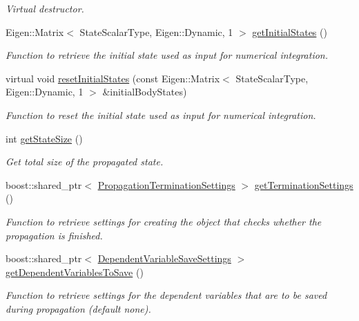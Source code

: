 \begin{DoxyCompactItemize}
\begin{DoxyCompactList}\small\item\em Virtual destructor. \end{DoxyCompactList}\item 
Eigen\+::\+Matrix$<$ State\+Scalar\+Type, Eigen\+::\+Dynamic, 1 $>$ \hyperlink{classtudat_1_1propagators_1_1PropagatorSettings_aabfec82eede276a2fd1151176e43d25d}{get\+Initial\+States} ()
\begin{DoxyCompactList}\small\item\em Function to retrieve the initial state used as input for numerical integration. \end{DoxyCompactList}\item 
virtual void \hyperlink{classtudat_1_1propagators_1_1PropagatorSettings_a372bd085a2032236531536f5d8c46fb3}{reset\+Initial\+States} (const Eigen\+::\+Matrix$<$ State\+Scalar\+Type, Eigen\+::\+Dynamic, 1 $>$ \&initial\+Body\+States)
\begin{DoxyCompactList}\small\item\em Function to reset the initial state used as input for numerical integration. \end{DoxyCompactList}\item 
int \hyperlink{classtudat_1_1propagators_1_1PropagatorSettings_a8d46d660668cc4c6401966f5089d3550}{get\+State\+Size} ()
\begin{DoxyCompactList}\small\item\em Get total size of the propagated state. \end{DoxyCompactList}\item 
boost\+::shared\+\_\+ptr$<$ \hyperlink{classtudat_1_1propagators_1_1PropagationTerminationSettings}{Propagation\+Termination\+Settings} $>$ \hyperlink{classtudat_1_1propagators_1_1PropagatorSettings_a3e8b6688bcf664efef6c5db56c3d9640}{get\+Termination\+Settings} ()
\begin{DoxyCompactList}\small\item\em Function to retrieve settings for creating the object that checks whether the propagation is finished. \end{DoxyCompactList}\item 
boost\+::shared\+\_\+ptr$<$ \hyperlink{classtudat_1_1propagators_1_1DependentVariableSaveSettings}{Dependent\+Variable\+Save\+Settings} $>$ \hyperlink{classtudat_1_1propagators_1_1PropagatorSettings_ab8f3f9c5ea7c20cbed6f3ec6b9d52c50}{get\+Dependent\+Variables\+To\+Save} ()
\begin{DoxyCompactList}\small\item\em Function to retrieve settings for the dependent variables that are to be saved during propagation (default none). \end{DoxyCompactList}\item 

\end{DoxyCompactItemize}
